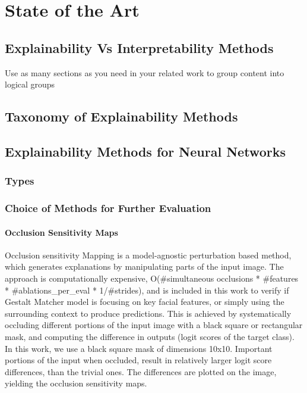 \documentclass[../report.tex]{subfiles}
\begin{document}
    \chapter{State of the Art}

    \section{Explainability Vs Interpretability Methods}
    Use as many sections as you need in your related work to group content into logical groups
    \section{Taxonomy of Explainability Methods}

    \section{Explainability Methods for Neural Networks}
    \subsection{Types}
    \subsection{Choice of Methods for Further Evaluation}
    \subsubsection{Occlusion Sensitivity Maps}
    Occlusion sensitivity Mapping is a model-agnostic perturbation based method, which generates explanations by manipulating parts of the input image. The approach is computationally expensive, O(#simultaneous occlusions * #features * #ablations\_per\_eval * 1/#strides), and is included in this work to verify if Gestalt Matcher model is focusing on key facial features, or simply using the surrounding context to produce predictions. This is achieved by systematically occluding different portions of the input image with a black square or rectangular mask, and computing the difference in outputs (logit scores of the target class). In this work, we use a  black square mask of dimensions 10x10. Important portions of the input when occluded, result in relatively larger logit score differences, than the trivial ones. The differences are plotted on the image, yielding the occlusion sensitivity maps.
    
\end{document}
